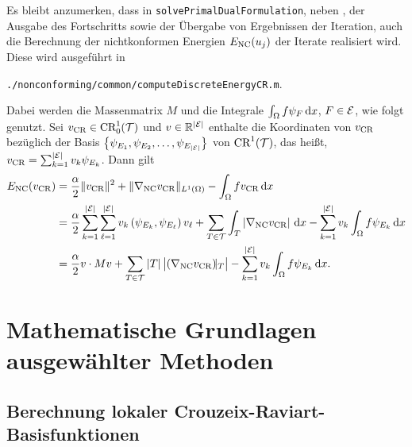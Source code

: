 Es bleibt anzumerken, dass in \texttt{solvePrimalDualFormulation}, neben 
, der Ausgabe des Fortschritts sowie
der Übergabe von Ergebnissen der Iteration, auch die
Berechnung der nichtkonformen Energien $E_\textup{NC}(u_j)$ der Iterate realisiert 
wird. 
Diese wird ausgeführt in
\begin{center}
  \texttt{./nonconforming/common/computeDiscreteEnergyCR.m}.
\end{center}
Dabei werden die Massenmatrix $M$ und die Integrale 
$\int_\Omega f\psi_{F}\,\mathrm{d}x$, $F\in\mathcal{E}$, wie folgt genutzt.
Sei $v_\textup{CR}\in\textup{CR}^1_0(\mathcal{T})$ und $v\in\mathbb{R}^{|\mathcal{E}|}$
enthalte die Koordinaten von $v_\textup{CR}$ bezüglich der Basis
$\left\{\psi_{E_1},\psi_{E_2},\ldots,\psi_{E_{|\mathcal{E}|}}\right\}$
von $\textup{CR}^1(\mathcal{T})$, das heißt,
$v_\textup{CR}=\sum_{k=1}^{|\mathcal{E}|}v_k \psi_{E_k}$.
Dann gilt
\begin{align*}
  E_\textup{NC}(v_\textup{CR})
  &=
  \frac{\alpha}{2}\Vert v_\textup{CR}\Vert^2
  + \Vert\nabla_\textup{NC} v_\textup{CR}\Vert_{L^1(\Omega)}
  -\int_\Omega fv_\textup{CR}\,\mathrm{d}x\\
  &=
  \frac{\alpha}{2}
  \sum_{k=1}^{|\mathcal{E}|} 
  \sum_{\ell=1}^{|\mathcal{E}|} 
  v_k\left( \psi_{E_k}, \psi_{E_\ell} \right)v_\ell
  + \sum_{T\in\mathcal{T}}
   \int_T\left|\nabla_\textup{NC} v_\textup{CR}\right|\,\mathrm{d}x
  -\sum_{k=1}^{|\mathcal{E}|}v_k\int_\Omega f\psi_{E_k}\,\mathrm{d}x\\
  &=
  \frac{\alpha}{2} v\cdot Mv
  + \sum_{T\in\mathcal{T}}|T|\, \big|\!\left(\nabla_\textup{NC} v_\textup{CR}\right)\!\!|_T\big|
  -\sum_{k=1}^{|\mathcal{E}|}v_k\int_\Omega f\psi_{E_k}\,\mathrm{d}x.
\end{align*}


\section{Mathematische Grundlagen ausgewählter Methoden}
\label{sec:mathematicalBasicsForMethods}

\subsection{Berechnung lokaler Crouzeix-Raviart-Basisfunktionen}
\label{sec:localCRBasisRealization}

